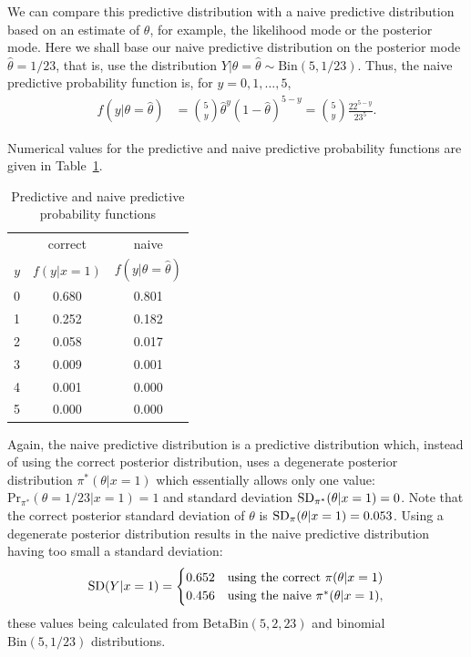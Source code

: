 We can compare this predictive distribution with a naive predictive distribution based on an estimate of $\theta$, for example, the likelihood mode or the posterior mode. Here we shall base our naive predictive distribution on the posterior mode $\hat{\theta}=1/23$, that is, use the distribution $Y|\theta=\hat\theta\sim \mathrm{Bin}(5,1/23)$. Thus, the naive predictive probability function is, for $y=0,1,\ldots,5$,
\begin{align*}
f(y|\theta=\hat{\theta})&=\binom{5}{y}\hat{\theta}^y(1-\hat{\theta})^{5-y} 
=\binom{5}{y}\frac{22^{5-y}}{23^5}.
\end{align*}

Numerical values for the predictive and naive predictive probability functions are given in Table~\ref{tab:predbetabin}.
\begin{table}[ht]
\bigskip

\begin{tabular}{|r|c|c|}
\cline{2-3}
\multicolumn{1}{c|}{~}& correct & naive \\
\cline{1-1}
$y$ & $f(y|x=1)$ & $f(y|\theta=\hat{\theta})$ \\
\hline
0 & 0.680 & 0.801 \\
1 & 0.252 & 0.182 \\
2 & 0.058 & 0.017 \\
3 & 0.009 & 0.001 \\
4 & 0.001 & 0.000 \\
5 & 0.000 & 0.000 \\
\hline
\end{tabular}

\caption{Predictive and naive predictive probability functions}
\label{tab:predbetabin}
\end{table}
Again, the naive predictive distribution is a predictive
distribution which, instead of using the correct posterior
distribution, uses a degenerate posterior distribution
$\pi^*(\theta|x=1)$ which essentially allows only one value: $\text{Pr}_{\pi^*}(\theta=1/23|x=1)=1$ and
standard deviation $\textnormal{SD}_{\pi^*}(\theta|x=1)=0$. Note that the correct
posterior standard deviation of $\theta$ is
$\textnormal{SD}_\pi(\theta|x=1)=0.053$. Using a degenerate posterior distribution
results in the naive predictive distribution having too small a
standard deviation:
\begin{equation*}
\textnormal{SD}(Y|x=1)=
\begin{cases} 0.652 & \text{using the correct }\pi(\theta|x=1) \\
              0.456 & \text{using the naive }\pi^*(\theta|x=1), \\
\end{cases}
\end{equation*}
these values being calculated from $\mathrm{BetaBin}(5,2,23)$ and binomial
$\mathrm{Bin}(5,1/23)$ distributions.

